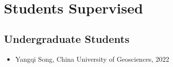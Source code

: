 \section{Students Supervised}

\subsection{Undergraduate Students}
\begin{itemize}
\item Yangqi Song, China University of Geosciences, 2022
\end{itemize}
